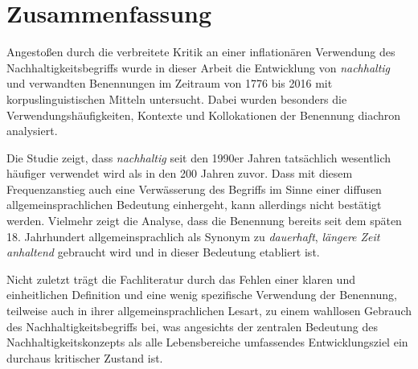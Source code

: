 \documentclass[
    german,
    a4paper,%
    12pt,%
    oneside,%
    toc=bibliography,
    final,
]{scrartcl}
\begin{document}
\section{Zusammenfassung}
\label{sec:zusammenfassung}

Angestoßen durch die verbreitete Kritik an einer inflationären Verwendung  des Nachhaltigkeitsbegriffs wurde in dieser Arbeit die Entwicklung von \textit{nachhaltig} und verwandten Benennungen im Zeitraum von 1776 bis 2016 mit korpuslinguistischen Mitteln untersucht. Dabei wurden besonders die Verwendungshäufigkeiten, Kontexte und Kollokationen der Benennung diachron analysiert.

Die Studie zeigt, dass \textit{nachhaltig} seit den 1990er Jahren tatsächlich wesentlich häufiger verwendet wird als in den 200 Jahren zuvor. Dass mit diesem Frequenzanstieg auch eine Verwässerung des Begriffs im Sinne einer diffusen allgemeinsprachlichen Bedeutung einhergeht, kann allerdings nicht bestätigt werden. Vielmehr zeigt die Analyse, dass die Benennung bereits seit dem späten 18. Jahrhundert allgemeinsprachlich als Synonym zu \textit{dauerhaft}, \textit{längere Zeit anhaltend} gebraucht wird und in dieser Bedeutung etabliert ist.

Nicht zuletzt trägt die Fachliteratur durch das Fehlen einer klaren und einheitlichen Definition und eine wenig spezifische Verwendung der Benennung, teilweise auch in ihrer allgemeinsprachlichen Lesart, zu einem wahllosen Gebrauch des Nachhaltigkeitsbegriffs bei, was angesichts der zentralen Bedeutung des Nachhaltigkeitskonzepts als alle Lebensbereiche umfassendes Entwicklungsziel ein durchaus kritischer Zustand ist.
\end{document}
